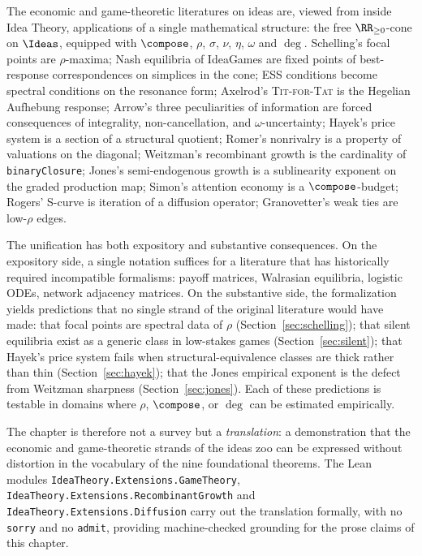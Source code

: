 The economic and game-theoretic literatures on ideas are, viewed from
inside Idea Theory, applications of a single mathematical structure: the
free $\RR_{\geq 0}$-cone on $\Ideas$, equipped with $\compose$, $\rho$,
$\sigma$, $\nu$, $\eta$, $\omega$ and $\deg$. Schelling's focal points
are $\rho$-maxima; Nash equilibria of IdeaGames are fixed points of
best-response correspondences on simplices in the cone; ESS conditions
become spectral conditions on the resonance form; Axelrod's
\textsc{Tit-for-Tat} is the Hegelian Aufhebung response; Arrow's three
peculiarities of information are forced consequences of integrality,
non-cancellation, and $\omega$-uncertainty; Hayek's price system is a
section of a structural quotient; Romer's nonrivalry is a property of
valuations on the diagonal; Weitzman's recombinant growth is the
cardinality of \texttt{binaryClosure}; Jones's semi-endogenous growth
is a sublinearity exponent on the graded production map; Simon's
attention economy is a $\compose$-budget; Rogers' S-curve is iteration
of a diffusion operator; Granovetter's weak ties are low-$\rho$ edges.

The unification has both expository and substantive consequences. On
the expository side, a single notation suffices for a literature that
has historically required incompatible formalisms: payoff matrices,
Walrasian equilibria, logistic ODEs, network adjacency matrices. On the
substantive side, the formalization yields predictions that no single
strand of the original literature would have made: that focal points
are spectral data of $\rho$ (Section~\ref{sec:schelling}); that
silent equilibria exist as a generic class in low-stakes games
(Section~\ref{sec:silent}); that Hayek's price system fails when
structural-equivalence classes are thick rather than thin
(Section~\ref{sec:hayek}); that the Jones empirical exponent is the
defect from Weitzman sharpness (Section~\ref{sec:jones}). Each of
these predictions is testable in domains where $\rho$, $\compose$, or
$\deg$ can be estimated empirically.

The chapter is therefore not a survey but a \emph{translation}: a
demonstration that the economic and game-theoretic strands of the
ideas zoo can be expressed without distortion in the vocabulary of the
nine foundational theorems. The Lean modules
\texttt{IdeaTheory.Extensions.GameTheory},
\texttt{IdeaTheory.Extensions.RecombinantGrowth} and
\texttt{IdeaTheory.Extensions.Diffusion} carry out the translation
formally, with no \texttt{sorry} and no \texttt{admit}, providing
machine-checked grounding for the prose claims of this chapter.

